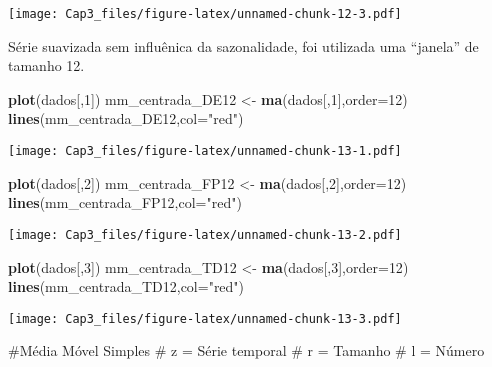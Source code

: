 \documentclass[]{article}
\newenvironment{Shaded}{\begin{snugshade}}{\end{snugshade}}
\newcommand{\DataTypeTok}[1]{\textcolor[rgb]{0.13,0.29,0.53}{#1}}
\newcommand{\DecValTok}[1]{\textcolor[rgb]{0.00,0.00,0.81}{#1}}
\newcommand{\KeywordTok}[1]{\textcolor[rgb]{0.13,0.29,0.53}{\textbf{#1}}}
\newcommand{\NormalTok}[1]{#1}
\newcommand{\StringTok}[1]{\textcolor[rgb]{0.31,0.60,0.02}{#1}}
\begin{document}
\texttt{[image: Cap3\_files/figure-latex/unnamed-chunk-12-3.pdf]}

Série suavizada sem influênica da sazonalidade, foi utilizada uma
``janela'' de tamanho 12.

\begin{Shaded}
\begin{Highlighting}[]
\KeywordTok{plot}\NormalTok{(dados[,}\DecValTok{1}\NormalTok{])}
\NormalTok{mm_centrada_DE12 <-}\StringTok{ }\KeywordTok{ma}\NormalTok{(dados[,}\DecValTok{1}\NormalTok{],}\DataTypeTok{order=}\DecValTok{12}\NormalTok{)}
\KeywordTok{lines}\NormalTok{(mm_centrada_DE12,}\DataTypeTok{col=}\StringTok{"red"}\NormalTok{)}
\end{Highlighting}
\end{Shaded}

\texttt{[image: Cap3\_files/figure-latex/unnamed-chunk-13-1.pdf]}

\begin{Shaded}
\begin{Highlighting}[]
\KeywordTok{plot}\NormalTok{(dados[,}\DecValTok{2}\NormalTok{])}
\NormalTok{mm_centrada_FP12 <-}\StringTok{ }\KeywordTok{ma}\NormalTok{(dados[,}\DecValTok{2}\NormalTok{],}\DataTypeTok{order=}\DecValTok{12}\NormalTok{)}
\KeywordTok{lines}\NormalTok{(mm_centrada_FP12,}\DataTypeTok{col=}\StringTok{"red"}\NormalTok{)}
\end{Highlighting}
\end{Shaded}

\texttt{[image: Cap3\_files/figure-latex/unnamed-chunk-13-2.pdf]}

\begin{Shaded}
\begin{Highlighting}[]
\KeywordTok{plot}\NormalTok{(dados[,}\DecValTok{3}\NormalTok{])}
\NormalTok{mm_centrada_TD12 <-}\StringTok{ }\KeywordTok{ma}\NormalTok{(dados[,}\DecValTok{3}\NormalTok{],}\DataTypeTok{order=}\DecValTok{12}\NormalTok{)}
\KeywordTok{lines}\NormalTok{(mm_centrada_TD12,}\DataTypeTok{col=}\StringTok{"red"}\NormalTok{)}
\end{Highlighting}
\end{Shaded}

\texttt{[image: Cap3\_files/figure-latex/unnamed-chunk-13-3.pdf]}

\#Média Móvel Simples \# z = Série temporal \# r = Tamanho \# l = Número
\end{document}
